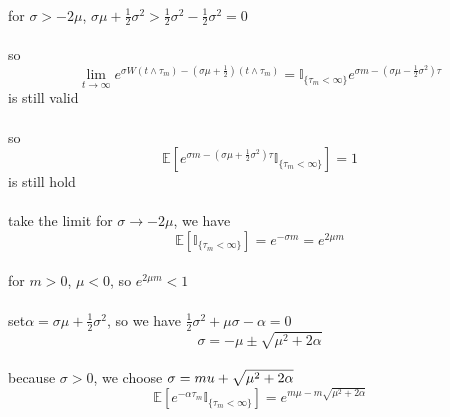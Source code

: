 \documentclass{article}
\begin{document}
\paragraph{}{for $\sigma>-2\mu$, $\sigma\mu+\frac{1}{2}\sigma^2>\frac{1}{2}\sigma^2-\frac{1}{2}\sigma^2=0$}
\paragraph{}{so \begin{displaymath}
  \lim_{t\to \infty}e^{\sigma W(t\land \tau_{m})-(\sigma\mu+\frac{1}{2})(t\land \tau_{m})}=
  \mathbb{I}_{\{\tau_{m}<\infty\}}e^{\sigma m-(\sigma \mu-\frac{1}{2}\sigma^2)\tau}
\end{displaymath} is still valid}
\paragraph{}{so \begin{displaymath}
                  \mathbb{E}[e^{\sigma m-(\sigma\mu+\frac{1}{2}\sigma^2)\tau}\mathbb{I}_{\{\tau_{m}<\infty\}}]=1
                \end{displaymath} is still hold}
\paragraph{}{take the limit for $\sigma \to -2\mu$, we have \begin{displaymath}
                                                              \mathbb{E}[\mathbb{I}_{\{\tau_{m}<\infty\}}]=e^{-\sigma m}=e^{2\mu m}
                                                            \end{displaymath}}
\paragraph{}{for $m>0$, $\mu<0$, so $e^{2\mu m}<1$}
\paragraph{}{set$\alpha = \sigma\mu+\frac{1}{2}\sigma^2$, so we have $\frac{1}{2}\sigma^2+\mu\sigma-\alpha=0$}
\begin{displaymath}
  \sigma=-\mu\pm \sqrt{\mu^2+2\alpha}
\end{displaymath}
\paragraph{}{because $\sigma >0$, we choose $\sigma=\-mu+\sqrt{\mu^2+2\alpha}$}
\begin{displaymath}
  \mathbb{E}[e^{-\alpha\tau_{m}}\mathbb{I}_{\{\tau_{m}<\infty\}}]=e^{m\mu-m\sqrt{\mu^2+2\alpha}}
\end{displaymath}
\end{document}
